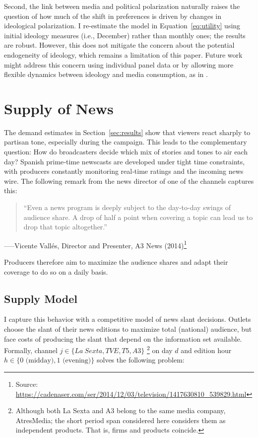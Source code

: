 \documentclass[12pt]{article}
\begin{document}
Second, the link between media and political polarization naturally raises the question of how much of the shift in preferences is driven by changes in ideological polarization. I re-estimate the model in Equation~\eqref{eq:utility} using initial ideology measures (i.e., December) rather than monthly ones; the results are robust. However, this does not mitigate the concern about the potential endogeneity of ideology, which remains a limitation of this paper. Future work might address this concern using individual panel data or by allowing more flexible dynamics between ideology and media consumption, as in \cite{martin2017}.

 



\section{Supply of News}


\label{sec:supply}



The demand estimates in Section~\ref{sec:results} show that viewers react sharply to
partisan tone, especially during the campaign.  This  leads to the complementary question:
How do broadcasters decide which mix of stories and tones to air each day? 
Spanish prime‑time newscasts are developed under tight time constraints, with producers
constantly monitoring real‑time ratings and the incoming news wire.  
The following remark from the news director of one of the channels captures this: 


\begin{quote}
	“Even a news program is deeply subject to the day-to-day swings of audience share.  
	A drop of half a point when covering a topic can lead us to drop that topic altogether.”
\end{quote}
\hspace*{\fill}–––Vicente Vallés, Director and Presenter, A3 News (2014)\footnote{Source: \url{https://cadenaser.com/ser/2014/12/03/television/1417630810_539829.html}}

Producers therefore aim to maximize the audience shares and adapt their coverage to do so on a daily basis.


\subsection{Supply Model}

I capture this behavior with a competitive model of news slant decisions. Outlets choose the slant of their news editions to maximize total (national) audience, but face costs of producing the slant that depend on the information set available.  Formally, channel $j\in \{La \ Sexta, TVE, T5, A3\}$ \footnote{Although both La Sexta and A3 belong to the same media company, AtresMedia; the short period span considered here considers them as independent products. That is, firms and products coincide. } on day $d$ and edition hour $h\in\{0\text{ (midday)},1\text{ (evening)}\}$ solves the following problem:
\end{document}
